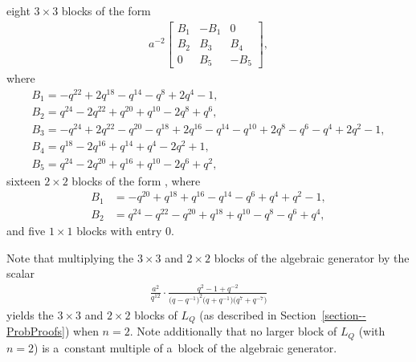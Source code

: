 \documentclass[pdftex]{sigma}
\numberwithin{equation}{section}
\theoremstyle{definition}
\newcommand{\flac}[2]{#1}
\begin{document}
eight $3 \times 3$ blocks of the form
\begin{align*}
 a^{-2} \begin{bmatrix}
 B_1 & -B_1 & 0 \\
 B_2 & B_3 & B_4 \\
 0 & B_5 & -B_5
 \end{bmatrix},
\end{align*}
where
\begin{gather*}
 B_1 = -\flac{q^{22}}{a^2}+\flac{2q^{18}}{a^2}-\flac{q^{14}}{a^2}-\flac{q^{8}}{a^2}+\flac{2q^{4}}{a^2}-\flac{1}{a^2}, \\
 B_2 = \flac{q^{24}}{a^2}-\flac{2q^{22}}{a^2}+\flac{q^{20}}{a^2}+\flac{q^{10}}{a^2}-\flac{2q^{8}}{a^2}+\flac{q^{6}}{a^2}, \\
 B_3 = -\flac{q^{24}}{a^2}+\flac{2q^{22}}{a^2}-\flac{q^{20}}{a^2}-\flac{q^{18}}{a^2}+\flac{2q^{16}}{a^2}-\flac{q^{14}}{a^2}-\flac{q^{10}}{a^2}+\flac{2q^{8}}{a^2}-\flac{q^{6}}{a^2}-\flac{q^{4}}{a^2}+\flac{2q^{2}}{a^2}-\flac{1}{a^2}, \\
 B_4 = \flac{q^{18}}{a^2}-\flac{2q^{16}}{a^2}+\flac{q^{14}}{a^2}+\flac{q^{4}}{a^2}-\flac{2q^{2}}{a^2}+\flac{1}{a^2}, \\
 B_5 = \flac{q^{24}}{a^2}-\flac{2q^{20}}{a^2}+\flac{q^{16}}{a^2}+\flac{q^{10}}{a^2}-\flac{2q^{6}}{a^2}+\flac{q^{2}}{a^2},
\end{gather*}
sixteen $2 \times 2$ blocks of the form
,
where
\begin{align*}
 B_1 &= -\flac{q^{20}}{a^2}+\flac{q^{18}}{a^2}+\flac{q^{16}}{a^2}-\flac{q^{14}}{a^2}-\flac{q^{6}}{a^2}+\flac{q^{4}}{a^2}+\flac{q^{2}}{a^2}-\flac{1}{a^2}, \\
 B_2 &= \flac{q^{24}}{a^2}-\flac{q^{22}}{a^2}-\flac{q^{20}}{a^2}+\flac{q^{18}}{a^2}+\flac{q^{10}}{a^2}-\flac{q^{8}}{a^2}-\flac{q^{6}}{a^2}+\flac{q^{4}}{a^2},
\end{align*}
and five $1 \times 1$ blocks with entry $0$.

Note that multiplying the $3 \times 3$ and $2 \times 2$ blocks of the algebraic generator by the scalar
\begin{align*}
 \frac{a^2}{q^{12}} \cdot \frac{q^2-1+q^{-2}}{\bigl(q-q^{-1}\bigr)^2 \bigl(q+q^{-1}\bigr) \bigl(q^7+q^{-7}\bigr)}
\end{align*}
yields the $3 \times 3$ and $2 \times 2$ blocks of $L_Q$ (as described in Section~\ref{section--ProbProofs}) when $n=2$. Note additionally that no larger block of $L_Q$ (with $n=2$) is a~constant multiple of a~block of the algebraic generator.
\end{document}
